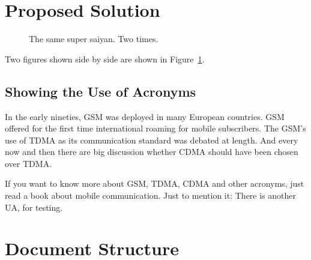 %
%

\section{Proposed Solution} 

\blindtext

\begin{figure}[!ht]
    \centering
    \qquad
    \caption[Short Caption]{The same super saiyan. Two times.}        
    \label{fig:test2}
\end{figure}

Two figures shown side by side are shown in Figure~\ref{fig:test2}.

\subsection{Showing the Use of Acronyms}

In the early nineties, \acs{GSM} was deployed in many European countries. \ac{GSM} offered for the first time international roaming for mobile subscribers. The \acs{GSM}’s use of \ac{TDMA} as its communication standard was debated at length. And every now and then there are big discussion whether \ac{CDMA} should have been chosen over \ac{TDMA}.

If you want to know more about \acf{GSM}, \acf{TDMA}, \acf{CDMA} and other acronyms, just read a book about mobile communication. Just to mention it: There is another \ac{UA}, for testing.


\section{Document Structure}

\blindtext
